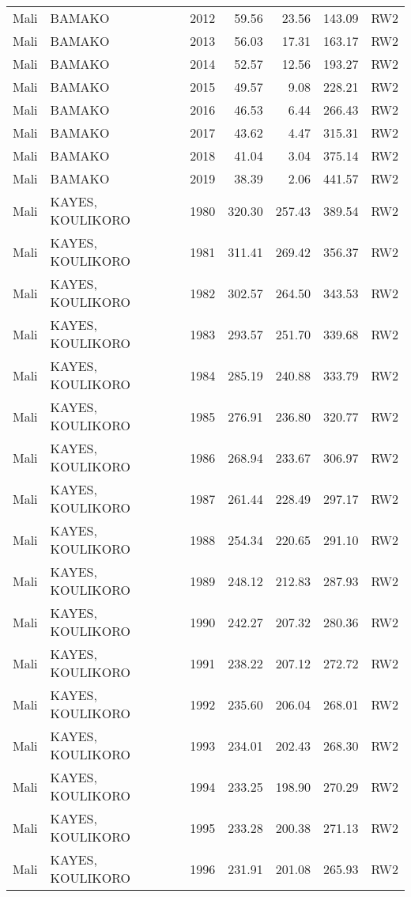\begin{longtable}{lllrrrl}
  Mali & BAMAKO & 2012 & 59.56 & 23.56 & 143.09 & RW2 \\ 
  Mali & BAMAKO & 2013 & 56.03 & 17.31 & 163.17 & RW2 \\ 
  Mali & BAMAKO & 2014 & 52.57 & 12.56 & 193.27 & RW2 \\ 
  Mali & BAMAKO & 2015 & 49.57 & 9.08 & 228.21 & RW2 \\ 
  Mali & BAMAKO & 2016 & 46.53 & 6.44 & 266.43 & RW2 \\ 
  Mali & BAMAKO & 2017 & 43.62 & 4.47 & 315.31 & RW2 \\ 
  Mali & BAMAKO & 2018 & 41.04 & 3.04 & 375.14 & RW2 \\ 
  Mali & BAMAKO & 2019 & 38.39 & 2.06 & 441.57 & RW2 \\ 
  Mali & KAYES, KOULIKORO & 1980 & 320.30 & 257.43 & 389.54 & RW2 \\ 
  Mali & KAYES, KOULIKORO & 1981 & 311.41 & 269.42 & 356.37 & RW2 \\ 
  Mali & KAYES, KOULIKORO & 1982 & 302.57 & 264.50 & 343.53 & RW2 \\ 
  Mali & KAYES, KOULIKORO & 1983 & 293.57 & 251.70 & 339.68 & RW2 \\ 
  Mali & KAYES, KOULIKORO & 1984 & 285.19 & 240.88 & 333.79 & RW2 \\ 
  Mali & KAYES, KOULIKORO & 1985 & 276.91 & 236.80 & 320.77 & RW2 \\ 
  Mali & KAYES, KOULIKORO & 1986 & 268.94 & 233.67 & 306.97 & RW2 \\ 
  Mali & KAYES, KOULIKORO & 1987 & 261.44 & 228.49 & 297.17 & RW2 \\ 
  Mali & KAYES, KOULIKORO & 1988 & 254.34 & 220.65 & 291.10 & RW2 \\ 
  Mali & KAYES, KOULIKORO & 1989 & 248.12 & 212.83 & 287.93 & RW2 \\ 
  Mali & KAYES, KOULIKORO & 1990 & 242.27 & 207.32 & 280.36 & RW2 \\ 
  Mali & KAYES, KOULIKORO & 1991 & 238.22 & 207.12 & 272.72 & RW2 \\ 
  Mali & KAYES, KOULIKORO & 1992 & 235.60 & 206.04 & 268.01 & RW2 \\ 
  Mali & KAYES, KOULIKORO & 1993 & 234.01 & 202.43 & 268.30 & RW2 \\ 
  Mali & KAYES, KOULIKORO & 1994 & 233.25 & 198.90 & 270.29 & RW2 \\ 
  Mali & KAYES, KOULIKORO & 1995 & 233.28 & 200.38 & 271.13 & RW2 \\ 
  Mali & KAYES, KOULIKORO & 1996 & 231.91 & 201.08 & 265.93 & RW2 \\ 

\end{longtable}
